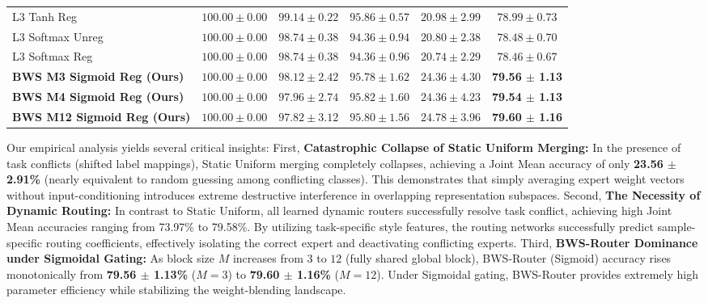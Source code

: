 \begin{table}[t]
\begin{center}
\begin{small}
\begin{tabular}{lccccc}
L3 Tanh Reg & $100.00 \pm 0.00$ & $99.14 \pm 0.22$ & $95.86 \pm 0.57$ & $20.98 \pm 2.99$ & $78.99 \pm 0.73$ \\ 
L3 Softmax Unreg & $100.00 \pm 0.00$ & $98.74 \pm 0.38$ & $94.36 \pm 0.94$ & $20.80 \pm 2.38$ & $78.48 \pm 0.70$ \\ 
L3 Softmax Reg & $100.00 \pm 0.00$ & $98.74 \pm 0.38$ & $94.36 \pm 0.96$ & $20.74 \pm 2.29$ & $78.46 \pm 0.67$ \\ 
\midrule
\textbf{BWS M3 Sigmoid Reg (Ours)} & $100.00 \pm 0.00$ & $98.12 \pm 2.42$ & $95.78 \pm 1.62$ & $24.36 \pm 4.30$ & \textbf{79.56 $\pm$ 1.13} \\ 
\textbf{BWS M4 Sigmoid Reg (Ours)} & $100.00 \pm 0.00$ & $97.96 \pm 2.74$ & $95.82 \pm 1.60$ & $24.36 \pm 4.23$ & \textbf{79.54 $\pm$ 1.13} \\ 
\textbf{BWS M12 Sigmoid Reg (Ours)} & $100.00 \pm 0.00$ & $97.82 \pm 3.12$ & $95.80 \pm 1.56$ & $24.78 \pm 3.96$ & \textbf{79.60 $\pm$ 1.16} \\ 
\bottomrule
\end{tabular}
\end{small}
\end{center}
\vskip -0.1in
\end{table}

Our empirical analysis yields several critical insights:
First, \textbf{Catastrophic Collapse of Static Uniform Merging:} In the presence of task conflicts (shifted label mappings), Static Uniform merging completely collapses, achieving a Joint Mean accuracy of only \textbf{23.56 $\pm$ 2.91\%} (nearly equivalent to random guessing among conflicting classes). This demonstrates that simply averaging expert weight vectors without input-conditioning introduces extreme destructive interference in overlapping representation subspaces.
Second, \textbf{The Necessity of Dynamic Routing:} In contrast to Static Uniform, all learned dynamic routers successfully resolve task conflict, achieving high Joint Mean accuracies ranging from 73.97\% to 79.58\%. By utilizing task-specific style features, the routing networks successfully predict sample-specific routing coefficients, effectively isolating the correct expert and deactivating conflicting experts.
Third, \textbf{BWS-Router Dominance under Sigmoidal Gating:} As block size $M$ increases from $3$ to $12$ (fully shared global block), BWS-Router (Sigmoid) accuracy rises monotonically from \textbf{79.56 $\pm$ 1.13\%} ($M=3$) to \textbf{79.60 $\pm$ 1.16\%} ($M=12$). Under Sigmoidal gating, BWS-Router provides extremely high parameter efficiency while stabilizing the weight-blending landscape.

